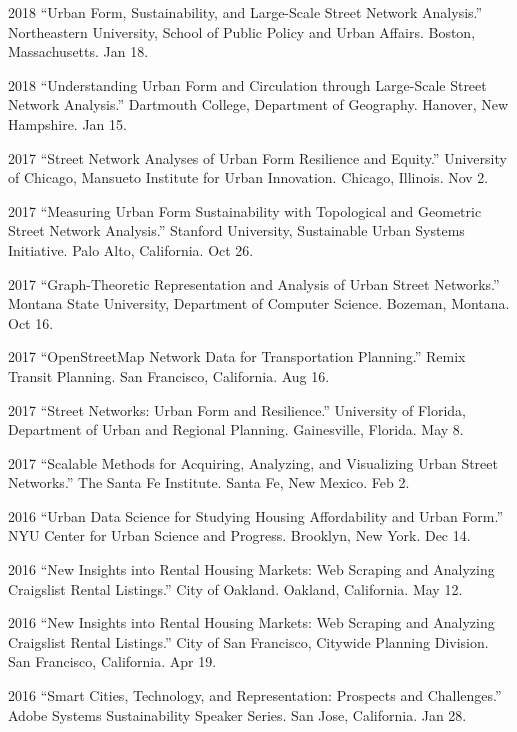 \documentclass[12pt,letterpaper]{report}
\begin{document}
\begin{tablist}
        \item[2018] \tab \enquote{Urban Form, Sustainability, and Large-Scale Street Network Analysis.} Northeastern University, School of Public Policy and Urban Affairs. Boston, Massachusetts. Jan 18.

        \item[2018] \tab \enquote{Understanding Urban Form and Circulation through Large-Scale Street Network Analysis.} Dartmouth College, Department of Geography. Hanover, New Hampshire. Jan 15.

        \item[2017] \tab \enquote{Street Network Analyses of Urban Form Resilience and Equity.} University of Chicago, Mansueto Institute for Urban Innovation. Chicago, Illinois. Nov 2.

        \item[2017] \tab \enquote{Measuring Urban Form Sustainability with Topological and Geometric Street Network Analysis.} Stanford University, Sustainable Urban Systems Initiative. Palo Alto, California. Oct 26.

        \item[2017] \tab \enquote{Graph-Theoretic Representation and Analysis of Urban Street Networks.} Montana State University, Department of Computer Science. Bozeman, Montana. Oct 16.

        \item[2017] \tab \enquote{OpenStreetMap Network Data for Transportation Planning.} Remix Transit Planning. San Francisco, California. Aug 16.

        \item[2017] \tab \enquote{Street Networks: Urban Form and Resilience.} University of Florida, Department of Urban and Regional Planning. Gainesville, Florida. May 8.

        \item[2017] \tab \enquote{Scalable Methods for Acquiring, Analyzing, and Visualizing Urban Street Networks.} The Santa Fe Institute. Santa Fe, New Mexico. Feb 2.

        \item[2016] \tab \enquote{Urban Data Science for Studying Housing Affordability and Urban Form.} NYU Center for Urban Science and Progress. Brooklyn, New York. Dec 14.

        \item[2016] \tab \enquote{New Insights into Rental Housing Markets: Web Scraping and Analyzing Craigslist Rental Listings.} City of Oakland. Oakland, California. May 12.

        \item[2016] \tab \enquote{New Insights into Rental Housing Markets: Web Scraping and Analyzing Craigslist Rental Listings.} City of San Francisco, Citywide Planning Division. San Francisco, California. Apr 19.

        \item[2016] \tab \enquote{Smart Cities, Technology, and Representation: Prospects and Challenges.} Adobe Systems Sustainability Speaker Series. San Jose, California. Jan 28.

    \end{tablist}
\end{document}
